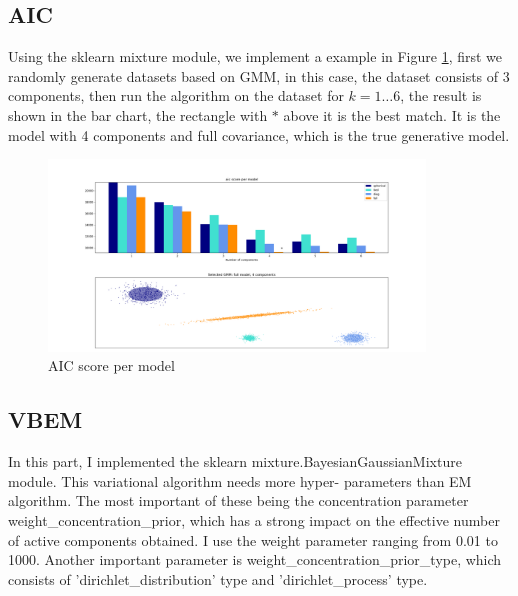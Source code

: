 \documentclass{article}
\theoremstyle{definition}
\numberwithin{equation}{section}
\numberwithin{figure}{section}
\begin{document}
\subsection{AIC}
Using the sklearn mixture module, we implement a example in Figure \ref{AIC}, first we
 randomly generate datasets based on GMM, in this case, the dataset consists of 3 components, then run the algorithm on the dataset for $k=1\dots 6$, the result is shown in the bar chart, the rectangle with $*$ above it is the best match. It is the model with 4 components and full covariance, which is the true generative model.
\begin{figure}[htbp]
	\centering
	\includegraphics[width=10cm]{problem3/AIC.png}
\caption{AIC score per model}
\label{AIC}
\end{figure}

\subsection{VBEM}
In this part, I implemented the sklearn mixture.BayesianGaussianMixture module. This variational algorithm needs more hyper- parameters than EM algorithm. The most important of these being the concentration parameter weight\_concentration\_prior, which has a strong impact on the effective number of active components obtained. I use the weight parameter ranging from 0.01 to 1000. Another important parameter is weight\_concentration\_prior\_type, which consists of 'dirichlet\_distribution' type and 'dirichlet\_process' type.
\end{document}
